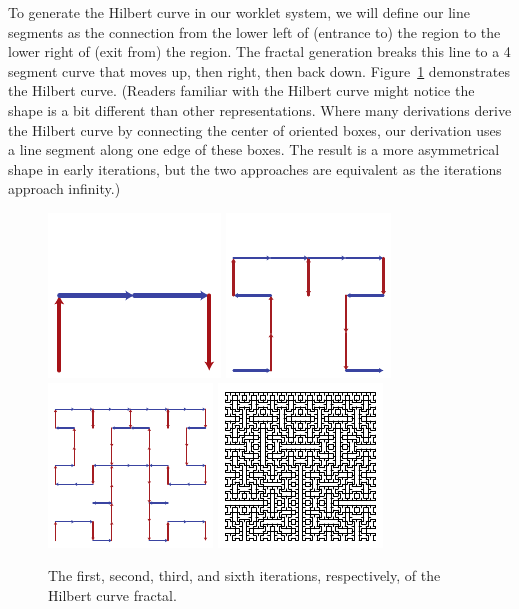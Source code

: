 To generate the Hilbert curve in our worklet system, we will define our line segments as the connection from the lower left of (entrance to) the region to the lower right of (exit from) the region.
The fractal generation breaks this line to a 4 segment curve that moves up, then right, then back down.
Figure~\ref{fig:Hilbert} demonstrates the Hilbert curve.
(Readers familiar with the Hilbert curve might notice the shape is a bit different than other representations.
Where many derivations derive the Hilbert curve by connecting the center of oriented boxes, our derivation uses a line segment along one edge of these boxes.
The result is a more asymmetrical shape in early iterations, but the two approaches are equivalent as the iterations approach infinity.)

\begin{figure}[htb]
  \centering
  \includegraphics[width=.24\linewidth]{images/Hilbert01}
  \hfill
  \includegraphics[width=.24\linewidth]{images/Hilbert02}
  \hfill
  \includegraphics[width=.24\linewidth]{images/Hilbert03}
  \hfill
  \includegraphics[width=.24\linewidth]{images/Hilbert06}
  \caption[Hilbert curve fractal.]{The first, second, third, and sixth iterations, respectively, of the Hilbert curve fractal.}
  \label{fig:Hilbert}
\end{figure}


